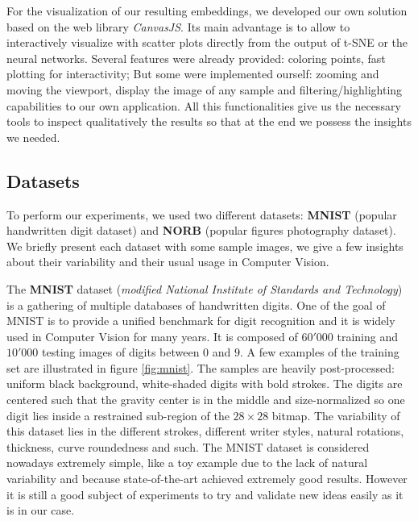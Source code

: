 \documentclass[a4paper,12pt]{report}
\begin{document}
For the visualization of our resulting embeddings, we developed our own solution based on the web library {\em CanvasJS}.
Its main advantage is to allow to interactively visualize with scatter plots directly from the output of t-SNE or the neural networks.
Several features were already provided: coloring points, fast plotting for interactivity; But some were implemented ourself: zooming and moving the viewport, display the image of any sample and filtering/highlighting capabilities to our own application.
All this functionalities give us the necessary tools to inspect qualitatively the results so that at the end we possess the insights we needed.

\subsection{Datasets}
To perform our experiments, we used two different datasets: {\bf MNIST}\cite{lecun1998mnist} (popular handwritten digit dataset) and {\bf NORB}\cite{lecun2004learning} (popular figures photography dataset).
We briefly present each dataset with some sample images, we give a few insights about their variability and their usual usage in Computer Vision.

The {\bf MNIST} dataset ({\em modified National Institute of Standards and Technology}) is a gathering of multiple databases of handwritten digits.
One of the goal of MNIST is to provide a unified benchmark for digit recognition and it is widely used in Computer Vision for many years.
It is composed of $60'000$ training and $10'000$ testing images of digits between $0$ and $9$.
A few examples of the training set are illustrated in figure \ref{fig:mnist}.
The samples are heavily post-processed: uniform black background, white-shaded digits with bold strokes.
The digits are centered such that the gravity center is in the middle and size-normalized so one digit lies inside a restrained sub-region of the $28 \times 28$ bitmap.
The variability of this dataset lies in the different strokes, different writer styles, natural rotations, thickness, curve roundedness and such.
The MNIST dataset is considered nowadays extremely simple, like a toy example due to the lack of natural variability and because state-of-the-art achieved extremely good results.
However it is still a good subject of experiments to try and validate new ideas easily as it is in our case.
\end{document}
